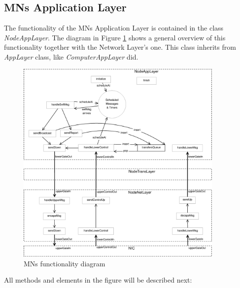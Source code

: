 \subsection{\acp{MN} Application Layer}

The functionality of the \acp{MN} Application Layer is contained in the class \textit{NodeAppLayer}. The diagram in Figure \ref{fig:MNschema} 
shows a general overview of this functionality together with the Network Layer's one. This class inherits from \textit{AppLayer} class, like
\textit{ComputerAppLayer} did.

\begin{figure}[ht]
 \begin{center}
  \includegraphics[width=0.9\textwidth]{MNschema.eps}
 \end{center}
 \caption{\acp{MN} functionality diagram}
 \label{fig:MNschema}
\end{figure}

All methods and elements in the figure will be described next:

